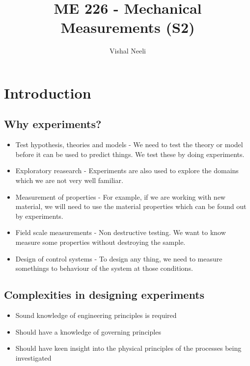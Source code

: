 \documentclass{article}
\title{ME 226 - Mechanical Measurements (S2)}
\author{Vishal Neeli}
\begin{document}
\maketitle

\section{Introduction}
	\subsection{Why experiments?}
		\begin{itemize}
			\item Test hypothesis, theories and models - We need to test the theory or model before it can be used to predict things. We test these by doing experiments.
			\item Exploratory reasearch - Experiments are also used to explore the domains which we are not very well familiar.
			\item Measurement of properties - For example, if we are working with new material, we will need to use the material properties which can be found out by experiments.
			\item Field scale measurements - Non destructive testing. We want to know measure some properties without destroying the sample.
			\item Design of control systems - To design any thing, we need to measure somethings to behaviour of the system at those conditions.
		\end{itemize}

	\subsection{Complexities in designing experiments}
		\begin{itemize}
			\item Sound knowledge of engineering principles is required
			\item Should have a knowledge of governing principles
			\item Should have keen insight into the physical principles of the processes being investigated
		\end{itemize}
\end{document}
